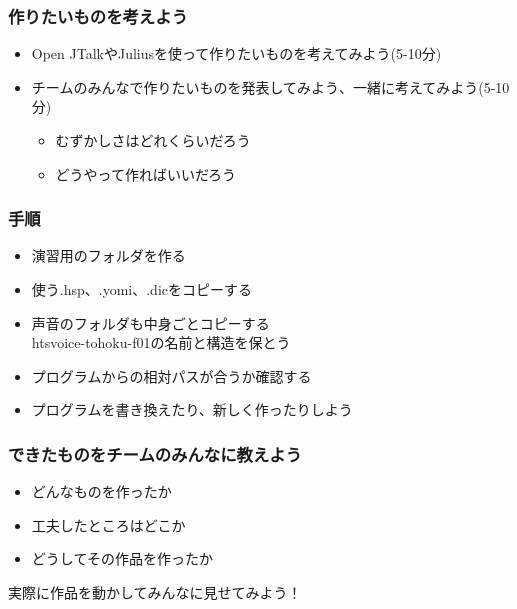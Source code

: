 \documentclass[14pt]{beamer}
\begin{document}
\begin{frame}
  \frametitle{作りたいものを考えよう}
  \begin{itemize}
    \item Open JTalkやJuliusを使って作りたいものを考えてみよう(5-10分)
    \item チームのみんなで作りたいものを発表してみよう、一緒に考えてみよう(5-10分)
    \begin{itemize}
      \item むずかしさはどれくらいだろう
      \item どうやって作ればいいだろう
    \end{itemize}
  \end{itemize}
\end{frame}

\begin{frame}
  \frametitle{手順}
  \begin{itemize}
    \item 演習用のフォルダを作る
    \item 使う.hsp、.yomi、.dicをコピーする
    \item 声音のフォルダも中身ごとコピーする\\htsvoice-tohoku-f01の名前と構造を保とう
    \item プログラムからの相対パスが合うか確認する
    \item プログラムを書き換えたり、新しく作ったりしよう
  \end{itemize}
\end{frame}

\begin{frame}
  \frametitle{できたものをチームのみんなに教えよう}
  \begin{itemize}
    \item どんなものを作ったか
    \item 工夫したところはどこか
    \item どうしてその作品を作ったか
  \end{itemize}
  実際に作品を動かしてみんなに見せてみよう！
\end{frame}
\end{document}
